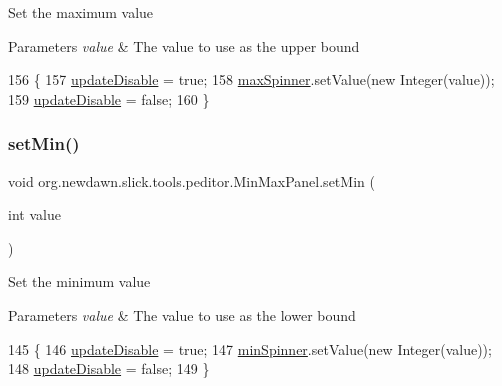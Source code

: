 Set the maximum value


\begin{DoxyParams}{Parameters}
{\em value} & The value to use as the upper bound \\
\hline
\end{DoxyParams}

\begin{DoxyCode}
156                                   \{
157         \mbox{\hyperlink{classorg_1_1newdawn_1_1slick_1_1tools_1_1peditor_1_1_min_max_panel_a491e9fbca948ae878becef9e86e06b74}{updateDisable}} = \textcolor{keyword}{true};
158         \mbox{\hyperlink{classorg_1_1newdawn_1_1slick_1_1tools_1_1peditor_1_1_min_max_panel_a9e445c1f2ecd3c64e93ec8bf69f639f9}{maxSpinner}}.setValue(\textcolor{keyword}{new} Integer(value));
159         \mbox{\hyperlink{classorg_1_1newdawn_1_1slick_1_1tools_1_1peditor_1_1_min_max_panel_a491e9fbca948ae878becef9e86e06b74}{updateDisable}} = \textcolor{keyword}{false};
160     \}
\end{DoxyCode}
\mbox{\label{classorg_1_1newdawn_1_1slick_1_1tools_1_1peditor_1_1_min_max_panel_af0431110deccd05c43e767dbc04cf9b8}} 
\subsubsection{\texorpdfstring{set\+Min()}{setMin()}}
{\footnotesize\ttfamily void org.\+newdawn.\+slick.\+tools.\+peditor.\+Min\+Max\+Panel.\+set\+Min (\begin{DoxyParamCaption}\item[{int}]{value }\end{DoxyParamCaption})\hspace{0.3cm}{\ttfamily [inline]}}

Set the minimum value


\begin{DoxyParams}{Parameters}
{\em value} & The value to use as the lower bound \\
\hline
\end{DoxyParams}

\begin{DoxyCode}
145                                   \{
146         \mbox{\hyperlink{classorg_1_1newdawn_1_1slick_1_1tools_1_1peditor_1_1_min_max_panel_a491e9fbca948ae878becef9e86e06b74}{updateDisable}} = \textcolor{keyword}{true};
147         \mbox{\hyperlink{classorg_1_1newdawn_1_1slick_1_1tools_1_1peditor_1_1_min_max_panel_ae09b9ecc2a254d7a74044bb20b6b62e6}{minSpinner}}.setValue(\textcolor{keyword}{new} Integer(value));
148         \mbox{\hyperlink{classorg_1_1newdawn_1_1slick_1_1tools_1_1peditor_1_1_min_max_panel_a491e9fbca948ae878becef9e86e06b74}{updateDisable}} = \textcolor{keyword}{false};
149     \}
\end{DoxyCode}


